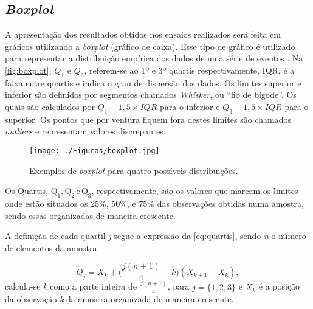 \subsection{\textit{Boxplot}}

A apresentação dos resultados obtidos nos ensaios realizados será feita em gráficos utilizando a \textit{boxplot} (gráfico de caixa). Esse tipo de gráfico é utilizado para representar a distribuição empírica dos dados \cite{portalaction2016} de uma série de eventos \cite{ferreira2016}. Na \autoref{fig:boxplot}, $Q_1$ e $Q_3$, referem-se ao 1º e 3º quartis respectivamente, IQR, é a faixa entre quartis e indica o grau de dispersão dos dados. Os limites superior e inferior são definidos por segmentos chamados \textit{Whisker}, ou ``fio de bigode''. Os quais são calculados por $Q_1 - 1,5\times{IQR}$ para o inferior e $Q_3 - 1,5\times{IQR}$ para o superior. Os pontos que por ventura fiquem fora destes limites são chamados \textit{outliers} e representam valores discrepantes.



\begin{figure}[H]
   \centering  
   \caption{Exemplos de \textit{boxplot} para quatro possíveis distribuições.}
   \texttt{[image: ./Figuras/boxplot.jpg]}
   \label{fig:boxplot}
\end{figure}

Os Quartis, $\mathrm{Q_1, Q_2\, e\, Q_3}$, respectivamente, são os valores que marcam os limites onde estão situados os 25\%, 50\%, e 75\% das observações obtidas numa amostra, sendo essas organizadas de maneira crescente.

A definição de cada quartil \textit{j} segue a expressão da \autoref{eq:quartis}, sendo \textit{n} o número de elementos da amostra.

\begin{equation}
Q_j = X_k + \Bigg( \frac{j(n+1)}{4} - k \Bigg)(X_{k+1}-X_k), \label{eq:quartis}
\end{equation}
calcula-se \textit{k} como a parte inteira de $\frac{j(n+1)}{4}$, para $j=\{1,2,3\}$ e $X_k$ é a posição da observação \textit{k} da amostra organizada de maneira crescente.


